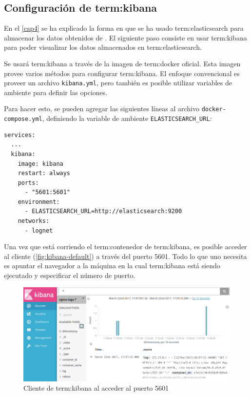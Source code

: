 \subsection{Configuración de \gls{term:kibana}}
\label{configuracion-de-kibana}

En el \autoref{cap4} se ha explicado la forma en que se ha usado
\gls{term:elasticsearch} para almacenar los datos obtenidos de . El
siguiente paso consiste en usar \gls{term:kibana} para poder visualizar los
datos almacenados en \gls{term:elasticsearch}.

Se usará \gls{term:kibana} a través de la imagen de \gls{term:docker} oficial.
Esta imagen provee varios métodos para configurar \gls{term:kibana}. El enfoque
convencional es proveer un archivo \texttt{kibana.yml}, pero también es
posible utilizar variables de ambiente para definir las opciones.

Para hacer esto, se pueden agregar las siguientes líneas al archivo
\lstinline{docker-compose.yml}, definiendo la variable de ambiente
\lstinline{ELASTICSEARCH_URL}:

\begin{lstlisting}
services:
  ...
  kibana:
    image: kibana
    restart: always
    ports:
      - "5601:5601"
    environment:
      - ELASTICSEARCH_URL=http://elasticsearch:9200
    networks:
      - lognet
\end{lstlisting}

Una vez que está corriendo el \gls{term:contenedor} de \gls{term:kibana}, es
posible acceder al cliente  (\autoref{fig:kibana-default}) a través
del puerto 5601. Todo lo que uno necesita es apuntar el navegador  a la
máquina en la cual \gls{term:kibana} está siendo ejecutado y especificar el
número de puerto.

\begin{figure}
  \includegraphics[width=\linewidth]{src/images/05-capitulo-5/kibanadefault.jpg}
  \caption{Cliente de \gls{term:kibana} al acceder al puerto 5601}
  \label{fig:kibana-default}
\end{figure}

